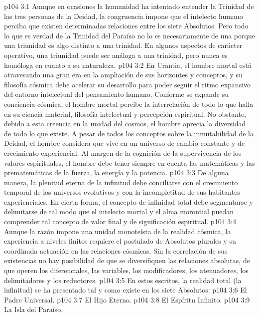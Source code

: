 \vs p104 3:1 Aunque en ocasiones la humanidad ha intentado entender la Trinidad de las tres personas de la Deidad, la congruencia impone que el intelecto humano perciba que existen determinadas relaciones entre los siete Absolutos. Pero todo lo que es verdad de la Trinidad del Paraíso no lo es necesariamente de una  porque una triunidad es algo distinto a una trinidad. En algunos aspectos de carácter operativo, una triunidad puede ser análoga a una trinidad, pero nunca es homóloga en cuanto a su naturaleza.
\vs p104 3:2 En Urantia, el hombre mortal está atravesando una gran era en la ampliación de sus horizontes y conceptos, y su filosofía cósmica debe acelerar su desarrollo para poder seguir el ritmo expansivo del entorno intelectual del pensamiento humano. Conforme se expande su conciencia cósmica, el hombre mortal percibe la interrelación de todo lo que halla en su ciencia material, filosofía intelectual y percepción espiritual. No obstante, debido a esta creencia en la unidad del cosmos, el hombre aprecia la diversidad de todo lo que existe. A pesar de todos los conceptos sobre la inmutabilidad de la Deidad, el hombre considera que vive en un universo de cambio constante y de crecimiento experiencial. Al margen de la cognición de la supervivencia de los valores espirituales, el hombre debe tener siempre en cuenta las matemáticas y las prematemáticas de la fuerza, la energía y la potencia.
\vs p104 3:3 De alguna manera, la plenitud eterna de la infinitud debe conciliarse con el crecimiento temporal de los universos evolutivos y con la incompletitud de sus habitantes experienciales. En cierta forma, el concepto de infinidad total debe segmentarse y delimitarse de tal modo que el intelecto mortal y el alma morontial puedan comprender tal concepto de valor final y de significación espiritual.
\vs p104 3:4 Aunque la razón impone una unidad monoteísta de la realidad cósmica, la experiencia a niveles finitos requiere el postulado de Absolutos plurales y su coordinada actuación en las relaciones cósmicas. Sin la correlación de sus existencias no hay posibilidad de que se diversifiquen las relaciones absolutas, de que operen los diferenciales, las variables, los modificadores, los atenuadores, los delimitadores y los reductores.
\vs p104 3:5 \pc En estos escritos, la realidad total (la infinitud) se ha presentado tal y como existe en los siete Absolutos:
\vs p104 3:6 El Padre Universal.
\vs p104 3:7 El Hijo Eterno.
\vs p104 3:8 El Espíritu Infinito.
\vs p104 3:9 La Isla del Paraíso.
